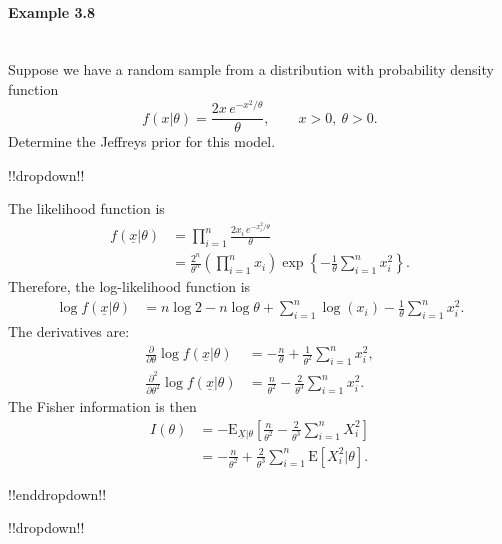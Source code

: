 \paragraph{Example 3.8}{~\\
Suppose we have a random sample from a distribution with probability \label{ex:37} density function
\begin{equation*}
f(x|\theta)=\frac{2x\,e^{-x^2/\theta}}{\theta},\quad\quad x>0,~\theta>0.
\end{equation*}
Determine the Jeffreys prior for this model.

!!dropdown!!

The likelihood function is
        \begin{align*}
        f(\underline{x}|\theta) 
        &=\prod_{i=1}^n \frac{2x_i\,e^{-x_i^2/\theta}}{\theta} \\
        &=\frac{2^n}{\theta^n}\left(\prod_{i=1}^n x_i\right)
        \exp\left\{-\frac{1}{\theta}\sum_{i=1}^n x_i^2\right\}.
        \end{align*}
        Therefore, the log-likelihood function is
        \begin{align*}
            \log f(\underline{x} | \theta) &= n\log 2 - n\log \theta + \sum_{i=1}^n\log(x_i) - \frac{1}{\theta}\sum_{i=1}^n x_i^2.
        \end{align*}
        The derivatives are:
        \begin{align*}
            \frac{\partial}{\partial \theta}\log f(\underline{x} | \theta) &= -\frac{n}{\theta} + \frac{1}{\theta^2}\sum_{i=1}^n x_i^2, \\
            \frac{\partial^2}{\partial \theta^2}\log f(\underline{x} | \theta) &= \frac{n}{\theta^2} - \frac{2}{\theta^3}\sum_{i=1}^n x_i^2.
        \end{align*}
        The Fisher information is then
        \begin{align*}
            I(\theta) &= -\text{E}_{\underline{X}|\theta}\left[ \frac{n}{\theta^2} - \frac{2}{\theta^3} \sum_{i=1}^n X_i^2  \right] \\
            &= -\frac{n}{\theta^2} + \frac{2}{\theta^3}\sum_{i=1}^n \text{E}[X_i^2|\theta].
        \end{align*}

!!enddropdown!!

\clearpage

!!dropdown!!

}
